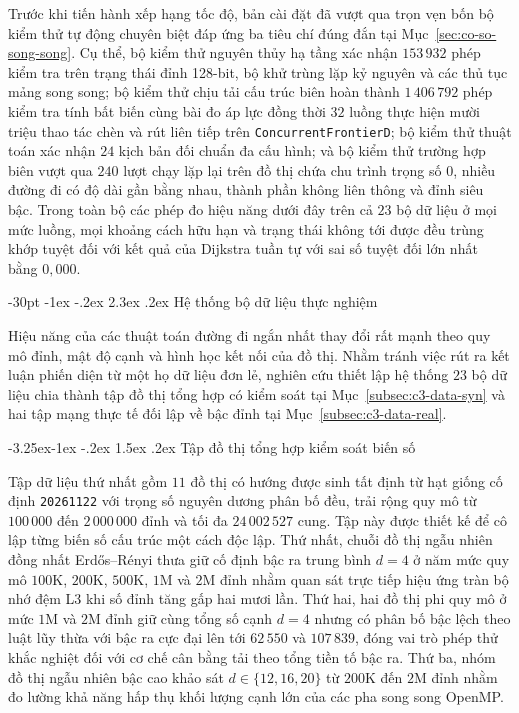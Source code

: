 \documentclass[12pt,a4paper,openany,oneside]{report}
\makeatletter
\theoremstyle{plain}
\renewcommand\section{\@startsection {section}{1}{\z@}
    {-30pt \@plus -1ex \@minus -.2ex}
    {2.3ex \@plus.2ex}
    {\normalfont\large\bfseries}}
\renewcommand\subsection{\@startsection{subsection}{2}{\z@}
    {-3.25ex\@plus -1ex \@minus -.2ex}
    {1.5ex \@plus .2ex}
    {\normalfont\normalsize\bfseries}}
\numberwithin{equation}{section}
\makeatother
\begin{document}
Trước khi tiến hành xếp hạng tốc độ, bản cài đặt đã vượt qua trọn vẹn bốn bộ kiểm thử tự động chuyên biệt đáp ứng ba tiêu chí đúng đắn tại Mục~\ref{sec:co-so-song-song}. Cụ thể, bộ kiểm thử nguyên thủy hạ tầng xác nhận $153\,932$ phép kiểm tra trên trạng thái đỉnh 128-bit, bộ khử trùng lặp kỷ nguyên và các thủ tục mảng song song; bộ kiểm thử chịu tải cấu trúc biên hoàn thành $1\,406\,792$ phép kiểm tra tính bất biến cùng bài đo áp lực đồng thời $32$ luồng thực hiện mười triệu thao tác chèn và rút liên tiếp trên \texttt{Concurrent\allowbreak FrontierD}; bộ kiểm thử thuật toán xác nhận $24$ kịch bản đối chuẩn đa cấu hình; và bộ kiểm thử trường hợp biên vượt qua $240$ lượt chạy lặp lại trên đồ thị chứa chu trình trọng số $0$, nhiều đường đi có độ dài gần bằng nhau, thành phần không liên thông và đỉnh siêu bậc. Trong toàn bộ các phép đo hiệu năng dưới đây trên cả $23$ bộ dữ liệu ở mọi mức luồng, mọi khoảng cách hữu hạn và trạng thái không tới được đều trùng khớp tuyệt đối với kết quả của Dijkstra tuần tự với sai số tuyệt đối lớn nhất bằng $0{,}000$.

\section{Hệ thống bộ dữ liệu thực nghiệm}\label{sec:c3-du-lieu}

Hiệu năng của các thuật toán đường đi ngắn nhất thay đổi rất mạnh theo quy mô đỉnh, mật độ cạnh và hình học kết nối của đồ thị. Nhằm tránh việc rút ra kết luận phiến diện từ một họ dữ liệu đơn lẻ, nghiên cứu thiết lập hệ thống $23$ bộ dữ liệu chia thành tập đồ thị tổng hợp có kiểm soát tại Mục~\ref{subsec:c3-data-syn} và hai tập mạng thực tế đối lập về bậc đỉnh tại Mục~\ref{subsec:c3-data-real}.

\subsection{Tập đồ thị tổng hợp kiểm soát biến số}\label{subsec:c3-data-syn}

Tập dữ liệu thứ nhất gồm $11$ đồ thị có hướng được sinh tất định từ hạt giống cố định \texttt{20261122} với trọng số nguyên dương phân bố đều, trải rộng quy mô từ $100\,000$ đến $2\,000\,000$ đỉnh và tối đa $24\,002\,527$ cung. Tập này được thiết kế để cô lập từng biến số cấu trúc một cách độc lập. Thứ nhất, chuỗi đồ thị ngẫu nhiên đồng nhất Erd\H{o}s--R\'{e}nyi thưa giữ cố định bậc ra trung bình $d = 4$ ở năm mức quy mô $100\mathrm{K}$, $200\mathrm{K}$, $500\mathrm{K}$, $1\mathrm{M}$ và $2\mathrm{M}$ đỉnh nhằm quan sát trực tiếp hiệu ứng tràn bộ nhớ đệm L3 khi số đỉnh tăng gấp hai mươi lần. Thứ hai, hai đồ thị phi quy mô ở mức $1\mathrm{M}$ và $2\mathrm{M}$ đỉnh giữ cùng tổng số cạnh $d = 4$ nhưng có phân bố bậc lệch theo luật lũy thừa với bậc ra cực đại lên tới $62\,550$ và $107\,839$, đóng vai trò phép thử khắc nghiệt đối với cơ chế cân bằng tải theo tổng tiền tố bậc ra. Thứ ba, nhóm đồ thị ngẫu nhiên bậc cao khảo sát $d \in \{12, 16, 20\}$ từ $200\mathrm{K}$ đến $2\mathrm{M}$ đỉnh nhằm đo lường khả năng hấp thụ khối lượng cạnh lớn của các pha song song OpenMP.
\end{document}
